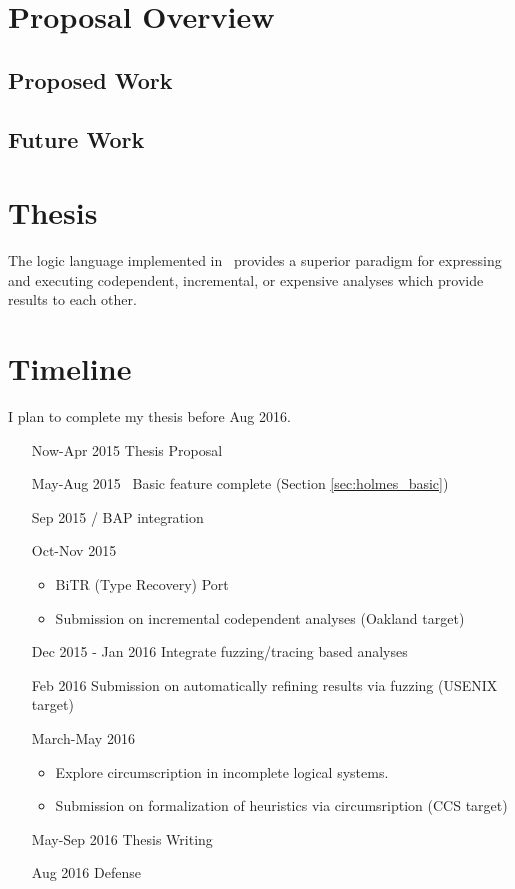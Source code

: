 \section{Proposal Overview}
\subsection{Proposed Work}
\subsection{Future Work}
\section{Thesis}
The logic language implemented in \sysname\ provides a superior paradigm for expressing and executing codependent, incremental, or expensive analyses which provide results to each other.
\section{Timeline}
I plan to complete my thesis before Aug 2016.
\begin{enumerate}
\item[Now-Apr 2015] Thesis Proposal
\item[May-Aug 2015] \sysname\ Basic feature complete (Section \ref{sec:holmes_basic})
\item[Sep 2015] \sysname / BAP integration
\item[Oct-Nov 2015]
  \begin{itemize}
  \item BiTR (Type Recovery) Port
  \item Submission on incremental codependent analyses (Oakland target)
  \end{itemize}
\item[Dec 2015 - Jan 2016] Integrate fuzzing/tracing based analyses
\item[Feb 2016] Submission on automatically refining results via fuzzing (USENIX target)
\item[March-May 2016]
  \begin{itemize}
  \item Explore circumscription in incomplete logical systems.
  \item Submission on formalization of heuristics via circumsription (CCS target)
  \end{itemize}
\item[May-Sep 2016] Thesis Writing
\item[Aug 2016] Defense
\end{enumerate}
